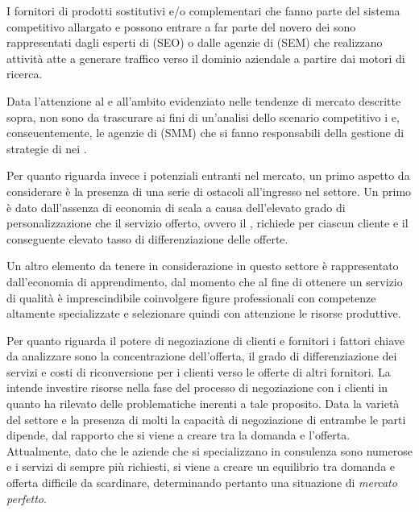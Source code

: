 I fornitori di prodotti sostitutivi e/o complementari che fanno parte del sistema competitivo allargato e possono entrare a far parte del novero dei  sono rappresentati dagli esperti di  (SEO) o dalle agenzie di  (SEM) che realizzano attività atte a generare traffico verso il dominio aziendale a partire dai motori di ricerca.

Data l'attenzione al  e all'ambito  evidenziato nelle tendenze di mercato descritte sopra, non sono da trascurare ai fini di un'analisi dello scenario competitivo i  e, conseuentemente, le agenzie di  (SMM) che si fanno responsabili della gestione di strategie di \mktg nei .

Per quanto riguarda invece i potenziali entranti nel mercato, un primo aspetto da considerare è la presenza di una serie di ostacoli all'ingresso nel settore. Un primo è dato dall'assenza di economia di scala a causa dell'elevato grado di personalizzazione che il servizio offerto, ovvero il \mktg {}, richiede per ciascun cliente e il conseguente elevato tasso di differenziazione delle offerte.

Un altro elemento da tenere in considerazione in questo settore è rappresentato dall'economia di apprendimento, dal momento che al fine di ottenere un servizio di qualità è imprescindibile coinvolgere figure professionali con competenze altamente specializzate e selezionare quindi con attenzione le risorse produttive.

Per quanto riguarda il potere di negoziazione di clienti e  fornitori i fattori chiave da analizzare sono la concentrazione dell'offerta, il grado di differenziazione dei servizi e costi di riconversione per i clienti verso le offerte di altri fornitori.
La \customer intende investire risorse nella fase del processo di negoziazione con i clienti in quanto ha rilevato delle problematiche inerenti a tale proposito.
Data la varietà del settore e la presenza di molti  la capacità di negoziazione di entrambe le parti dipende, dal rapporto che si viene a creare tra la domanda e l'offerta. Attualmente, dato che le aziende che si specializzano in consulenza \mktg sono numerose e i servizi di \mktg sempre più richiesti, si viene a creare un equilibrio tra domanda e offerta difficile da scardinare, determinando pertanto una situazione di \emph{mercato perfetto}. 

